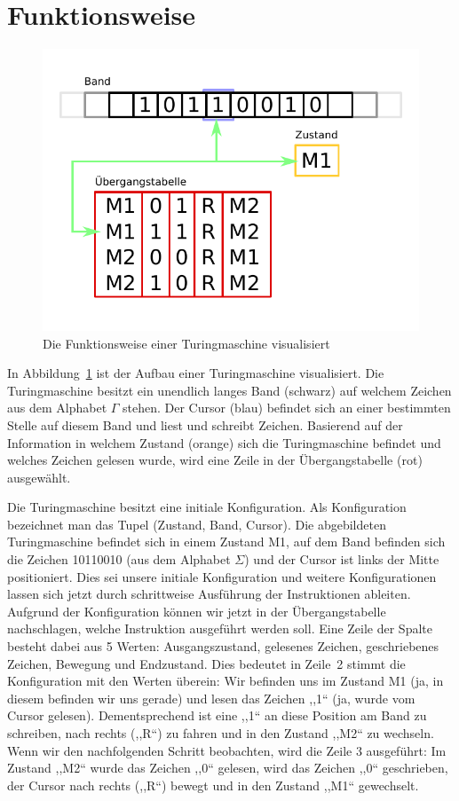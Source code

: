 \section{Funktionsweise}
%
\begin{figure}[ht]
 \begin{center}
  \includegraphics{img/turingmachine_visualization.pdf}
  \caption{Die Funktionsweise einer Turingmaschine visualisiert}
  \label{fig:tm_vis}
 \end{center}
\end{figure}
%
In Abbildung~\ref{fig:tm_vis} ist der Aufbau einer Turingmaschine visualisiert. Die Turingmaschine besitzt ein unendlich langes Band (schwarz) auf welchem Zeichen aus dem Alphabet $\Gamma$ stehen. Der Cursor (blau) befindet sich an einer bestimmten Stelle auf diesem Band und liest und schreibt Zeichen. Basierend auf der Information in welchem Zustand (orange) sich die Turingmaschine befindet und welches Zeichen gelesen wurde, wird eine Zeile in der Übergangstabelle (rot) ausgewählt.

Die Turingmaschine besitzt eine initiale Konfiguration. Als Konfiguration bezeichnet man das Tupel (Zustand, Band, Cursor). Die abgebildeten Turingmaschine befindet sich in einem Zustand M1, auf dem Band befinden sich die Zeichen 10110010 (aus dem Alphabet $\Sigma$) und der Cursor ist links der Mitte positioniert. Dies sei unsere initiale Konfiguration und weitere Konfigurationen lassen sich jetzt durch schrittweise Ausführung der Instruktionen ableiten. \\
Aufgrund der Konfiguration können wir jetzt in der Übergangstabelle nachschlagen, welche Instruktion ausgeführt werden soll. Eine Zeile der Spalte besteht dabei aus 5 Werten: Ausgangszustand, gelesenes Zeichen, geschriebenes Zeichen, Bewegung und Endzustand. Dies bedeutet in Zeile~2 stimmt die Konfiguration mit den Werten überein: Wir befinden uns im Zustand M1 (ja, in diesem befinden wir uns gerade) und lesen das Zeichen ,,1`` (ja, wurde vom Cursor gelesen). Dementsprechend ist eine ,,1`` an diese Position am Band zu schreiben, nach rechts (,,R``) zu fahren und in den Zustand ,,M2`` zu wechseln. Wenn wir den nachfolgenden Schritt beobachten, wird die Zeile 3 ausgeführt: Im Zustand ,,M2`` wurde das Zeichen ,,0`` gelesen, wird das Zeichen ,,0`` geschrieben, der Cursor nach rechts (,,R``) bewegt und in den Zustand ,,M1`` gewechselt.


